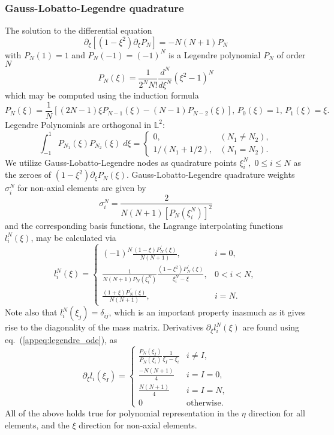 \documentclass[11pt,letter,fleqn,english,notitlepage]{article}
\newcommand{\eq}{\begin{equation}} \newcommand{\en}{\end{equation}}
\begin{document}
\subsubsection{Gauss-Lobatto-Legendre quadrature} \label{appsection:gll}
%
The solution to the differential equation 
\eq \label{appeq:legendre_ode}
\partial_\xi \left[\left(1-\xi^2\right)\partial_\xi P_N\right] 
= -N\left(N+1\right)P_N
\en
%
with $P_N(1)=1$ and $P_N(-1)=(-1)^N$ is a Legendre polynomial $P_N$ 
of order $N$
\eq \label{appeq:legendrepol}
P_N(\xi)=\frac{1}{2^N N!}\frac{d^N}{d\xi^N}(\xi^2-1)^N
\en
which may be computed using the induction formula
\eq
P_N(\xi)=\frac{1}{N}\left[(2N-1)\xi P_{N-1}(\xi)-(N-1)P_{N-2}(\xi)\right]
\textrm{, $P_0(\xi)=1$, $P_1(\xi)=\xi$}.
\en
%
Legendre Polynomials are orthogonal in $\mathbb{L}^2$:
\eq
\int_{-1}^{1}P_{N_1}(\xi)P_{N_2}(\xi)\;d\xi=\left\{
\begin{array}{cr}
0,  & (N_1\ne N_2),\\ 
1/(N_1+1/2), & (N_1=N_2).
\end{array}\right.
\en
%
We utilize Gauss-Lobatto-Legendre nodes as quadrature points
$\xi^N_i,\; 0\le i\le N$ as the zeroes of $(1-\xi^2)\partial_\xi P_N(\xi)$. 
Gauss-Lobatto-Legendre quadrature weights $\sigma^N_i$ for non-axial elements 
are given by
%
\eq
\sigma^N_i=\frac{2}{N(N+1)[P_N(\xi^N_i)]^2} 
\en
%
and the corresponding basis functions, the Lagrange interpolating functions 
$l_i^N(\xi)$, may be calculated via 
%
\eq
l_i^N(\xi)=\left\{
\begin{array}{ll}
(-1)^N \frac{(1-\xi)P^{\,\prime}_N(\xi)}{N(N+1)}, & i=0, \\ [8pt]
\frac{1}{N(N+1)P_N(\xi_i^N)}\frac{(1-\xi^2)P^{\,\prime}_N(\xi)}{\xi_i^N-\xi},&
0<i<N,\\[8pt]
\frac{(1+\xi)P^{\,\prime}_N(\xi)}{N(N+1)}, & i=N.
\end{array}\right.
\en
%
Note also that $l^{N}_i(\xi_j)=\delta_{ij}$, which is an important 
property inasmuch as it gives rise to the diagonality of the mass matrix.
Derivatives $\partial_\xi l_i^N(\xi)$ are found using 
eq.~(\ref{appeq:legendre_ode}), as \citep{fournierthesis}
%
\eq
\partial_\xi l_i(\xi_I)=
\left\{
\begin{array}{ll}
\frac{P_N(\xi_I)}{P_N(\xi_i)} \frac{1}{\xi_I-\xi_i} & i\ne I, \\ [8pt]
\frac{-N(N+1)}{4} & i=I=0, \\ [8pt]
\frac{N(N+1)}{4} & i=I=N, \\ [8pt]
0 & \textrm{otherwise}. 
\end{array}\right.
\en
%
All of the above holds true for polynomial 
representation in the $\eta$ direction for all elements, and the $\xi$ 
direction for non-axial elements. 
%
\end{document}
